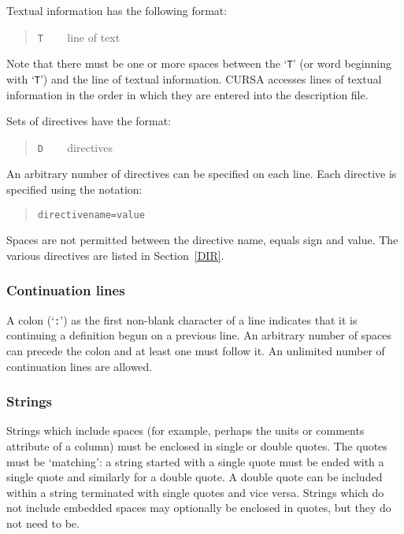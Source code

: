 \documentclass[twoside,11pt]{article}
\renewcommand{\_}{\texttt{\symbol{95}}}
\begin{document}
Textual information has the following format:

\begin{quote}
{\tt T} ~~~ line of text
\end{quote}

Note that there must be one or more spaces between the `{\tt T}' (or
word beginning with `{\tt T}') and the line of textual information.
CURSA accesses lines of textual information in the order in which
they are entered into the description file.

Sets of directives have the format:

\begin{quote}
{\tt D} ~~~ directives
\end{quote}

An arbitrary number of directives can be specified on each line.  Each
directive is specified using the notation:

\begin{quote}
{\tt directive\_name=value}
\end{quote}

Spaces are not permitted between the directive name, equals sign and
value.  The various directives are listed in Section~\ref{DIR}.

\subsubsection{Continuation lines}

A colon (`{\tt :}') as the first non-blank character of a line indicates
that it is continuing a definition begun on a previous line.  An
arbitrary number of spaces can precede the colon and at least one
must follow it.  An unlimited number of continuation lines are allowed.

\subsubsection{Strings}

Strings which include spaces (for example, perhaps the units or comments
attribute of a column) must be enclosed in single or double quotes.  The
quotes must be `matching': a string started with a single quote must be
ended with a single quote and similarly for a double quote.  A double quote
can be included within a string terminated with single quotes and vice
versa.  Strings which do not include embedded spaces may optionally be
enclosed in quotes, but they do not need to be.
\end{document}
